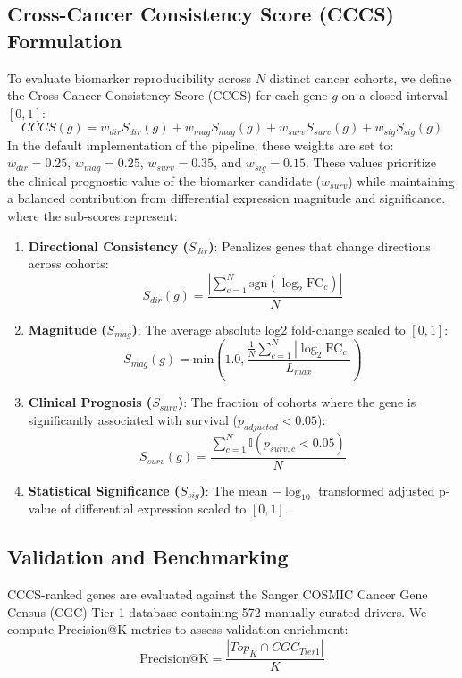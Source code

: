 \documentclass[11pt,a4paper]{article}
\begin{document}
\subsection{Cross-Cancer Consistency Score (CCCS) Formulation}
To evaluate biomarker reproducibility across $N$ distinct cancer cohorts, we define the Cross-Cancer Consistency Score (CCCS) for each gene $g$ on a closed interval $[0, 1]$:
\begin{equation}
CCCS(g) = w_{dir} S_{dir}(g) + w_{mag} S_{mag}(g) + w_{surv} S_{surv}(g) + w_{sig} S_{sig}(g)
\end{equation}
In the default implementation of the pipeline, these weights are set to: $w_{dir} = 0.25$, $w_{mag} = 0.25$, $w_{surv} = 0.35$, and $w_{sig} = 0.15$. These values prioritize the clinical prognostic value of the biomarker candidate ($w_{surv}$) while maintaining a balanced contribution from differential expression magnitude and significance.
where the sub-scores represent:
\begin{enumerate}
    \item \textbf{Directional Consistency ($S_{dir}$)}: Penalizes genes that change directions across cohorts:
    \begin{equation}
    S_{dir}(g) = \frac{\left| \sum_{c=1}^N \text{sgn}(\log_2 \text{FC}_c) \right|}{N}
    \end{equation}
    \item \textbf{Magnitude ($S_{mag}$)}: The average absolute log2 fold-change scaled to $[0,1]$:
    \begin{equation}
    S_{mag}(g) = \text{min}\left(1.0, \frac{\frac{1}{N}\sum_{c=1}^N |\log_2 \text{FC}_c|}{L_{max}}\right)
    \end{equation}
    \item \textbf{Clinical Prognosis ($S_{surv}$)}: The fraction of cohorts where the gene is significantly associated with survival ($p_{adjusted} < 0.05$):
    \begin{equation}
    S_{surv}(g) = \frac{\sum_{c=1}^N \mathbb{I}(p_{surv, c} < 0.05)}{N}
    \end{equation}
    \item \textbf{Statistical Significance ($S_{sig}$)}: The mean $-\log_{10}$ transformed adjusted p-value of differential expression scaled to $[0,1]$.
\end{enumerate}

\subsection{Validation and Benchmarking}
CCCS-ranked genes are evaluated against the Sanger COSMIC Cancer Gene Census (CGC) Tier 1 database containing 572 manually curated drivers. We compute Precision@K metrics to assess validation enrichment:
\begin{equation}
\text{Precision@K} = \frac{|Top_K \cap CGC_{Tier1}|}{K}
\end{equation}
\end{document}
